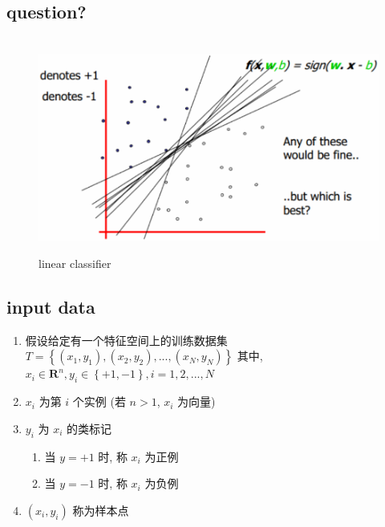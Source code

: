 \documentclass[oneside, 12pt]{ctexbook}
\begin{document}
			\subsection{\quad question?} 
				\begin{figure}[H]
					\vspace{-0.2cm}  %
					\setlength{\abovecaptionskip}{-0.2cm}   %
					\centering
					\includegraphics[scale=0.6]{linear_classifier.png}
					\renewcommand{\figurename}{Fig} %
					\caption{linear classifier}
					\label{fig:10}
				\end{figure}
				
			\subsection{\quad input data} 
				\begin{enumerate}
					\item 假设给定有一个特征空间上的训练数据集 $T = \left\{ (x_1, y_1), (x_2, y_2), ..., (x_N, y_N) \right\}$
						其中, $x_i \in \boldsymbol{\text{R}}^n, y_i \in \left\{ +1, -1 \right\}, i=1,2,...,N $
						
					\item $x_i$ 为第 $i$ 个实例 (若 $n>1$, $x_i$ 为向量)
					
					\item $y_i$ 为 $x_i$ 的类标记
						\begin{enumerate}
							\item 当 $y = +1$ 时, 称 $x_i$ 为正例
							
							\item 当 $y = -1$ 时, 称 $x_i$ 为负例
						\end{enumerate}
					
					\item $(x_i, y_i)$ 称为样本点
				\end{enumerate}
\end{document}
